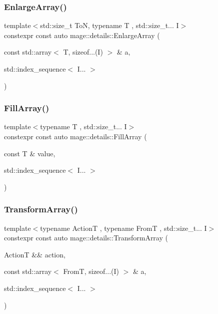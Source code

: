 \subsubsection{\texorpdfstring{Enlarge\+Array()}{EnlargeArray()}}
{\footnotesize\ttfamily template$<$std\+::size\+\_\+t ToN, typename T , std\+::size\+\_\+t... I$>$ \\
constexpr const auto mage\+::details\+::\+Enlarge\+Array (\begin{DoxyParamCaption}\item[{const std\+::array$<$ T, sizeof...(I) $>$ \&}]{a,  }\item[{std\+::index\+\_\+sequence$<$ I... $>$}]{ }\end{DoxyParamCaption})}

\mbox{\label{namespacemage_1_1details_ae5b148b74b882be8b1afd09832808a67}} 
\subsubsection{\texorpdfstring{Fill\+Array()}{FillArray()}}
{\footnotesize\ttfamily template$<$typename T , std\+::size\+\_\+t... I$>$ \\
constexpr const auto mage\+::details\+::\+Fill\+Array (\begin{DoxyParamCaption}\item[{const T \&}]{value,  }\item[{std\+::index\+\_\+sequence$<$ I... $>$}]{ }\end{DoxyParamCaption})}

\mbox{\label{namespacemage_1_1details_a597d1869ab9d86b34b67dc7d941dc5e5}} 
\subsubsection{\texorpdfstring{Transform\+Array()}{TransformArray()}}
{\footnotesize\ttfamily template$<$typename ActionT , typename FromT , std\+::size\+\_\+t... I$>$ \\
constexpr const auto mage\+::details\+::\+Transform\+Array (\begin{DoxyParamCaption}\item[{ActionT \&\&}]{action,  }\item[{const std\+::array$<$ FromT, sizeof...(I) $>$ \&}]{a,  }\item[{std\+::index\+\_\+sequence$<$ I... $>$}]{ }\end{DoxyParamCaption})}

